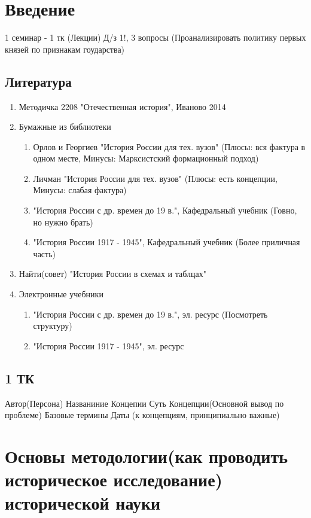 \documentclass[a4paper]{article}
\begin{document}
\section{Введение}

1 семинар - 1 тк (Лекции)
Д/з 1!, 3 вопросы (Проанализировать
политику первых князей по признакам гоударства)
\subsection{Литература}

\begin{enumerate}
\item Методичка 2208
"Отечественная история", Иваново 2014
\item Бумажные из библиотеки
    \begin{enumerate}
    \item Орлов и Георгиев "История России для тех. вузов"
    (Плюсы: вся фактура в одном месте, Минусы: Марксистский формационный подход)
    \item Личман "История России для тех. вузов"
    (Плюсы: есть концепции, Минусы: слабая фактура)
    \item "История России с др. времен до 19 в.", Кафедральный учебник
    (Говно, но нужно брать)
    \item "История России 1917 - 1945", Кафедральный учебник
    (Более приличная часть)
    \end{enumerate}
\item Найти(совет) "История России в схемах и таблцах"
\item Электронные учебники
    \begin{enumerate}
    \item "История России с др. времен до 19 в.", эл. ресурс
    (Посмотреть структуру)
    \item "История России 1917 - 1945", эл. ресурс
    \end{enumerate}
\end{enumerate}

\subsection{1 ТК}

Автор(Персона)
Названиние Концепии
Суть Концепции(Основной вывод по проблеме)
Базовые термины
Даты (к концепциям, принципиально важные)

\section{Основы методологии(как проводить историческое исследование)
исторической науки}
\end{document}
